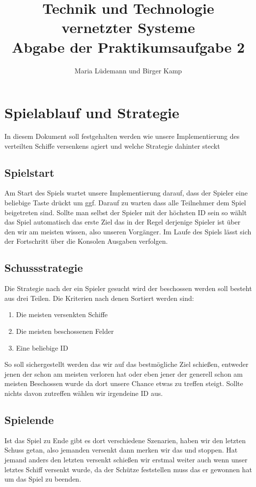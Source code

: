 \documentclass[]{scrartcl}
\title{Technik und Technologie vernetzter Systeme  \\ Abgabe der Praktikumsaufgabe 2}
\author{Maria Lüdemann und Birger Kamp}
\begin{document}
\maketitle

\section{Spielablauf und Strategie}
In diesem Dokument soll festgehalten werden wie unsere Implementierung des verteilten Schiffe versenkens agiert und welche Strategie dahinter steckt


\subsection{Spielstart}
Am Start des Spiels wartet unsere Implementierung darauf, dass der Spieler eine beliebige Taste drückt um ggf. Darauf zu warten dass alle Teilnehmer dem Spiel beigetreten sind. Sollte man selbst der Spieler mit der höchsten ID sein so wählt das Spiel automatisch das erste Ziel das in der Regel derjenige Spieler ist über den wir am meisten wissen, also unseren Vorgänger. Im Laufe des Spiels lässt sich der Fortschritt über die Konsolen Ausgaben verfolgen.

\subsection{Schussstrategie}
Die Strategie nach der ein Spieler gesucht wird der beschossen werden soll besteht aus drei Teilen. Die Kriterien nach denen Sortiert werden sind:

\begin{enumerate}
\item Die meisten versenkten Schiffe 
\item Die meisten beschossenen Felder
\item Eine beliebige ID 
\end{enumerate}

So soll sichergestellt werden das wir auf das bestmögliche Ziel schießen, entweder jenen der schon am meisten verloren hat oder eben jener der generell schon am meisten Beschossen wurde da dort unsere Chance etwas zu treffen steigt.
Sollte nichts davon zutreffen wählen wir irgendeine ID aus.

\subsection{Spielende}

Ist das Spiel zu Ende gibt es dort verschiedene Szenarien, haben wir den letzten Schuss getan, also jemanden versenkt dann merken wir das und stoppen. Hat jemand anders den letzten versenkt schießen wir erstmal weiter auch wenn unser letztes Schiff versenkt wurde, da der Schütze feststellen muss das er gewonnen hat um das Spiel zu beenden. 
\end{document}
